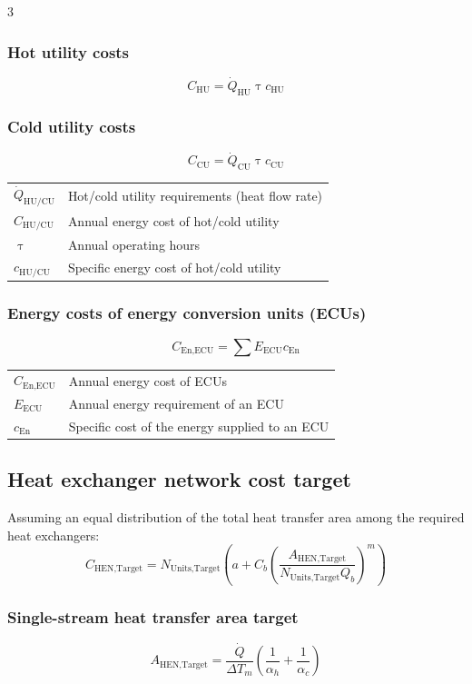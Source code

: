 \documentclass[9pt, landscape, a4paper]{article}
\renewcommand{\tau}{\uptau}
\begin{document}
\begin{multicols*}{3}
\subsubsection{Hot utility costs}
\[C_\text{HU} = \dot{Q}_\text{HU}\tau c_\text{HU}\]

\subsubsection{Cold utility costs}
\[C_\text{CU} = \dot{Q}_\text{CU}\tau c_\text{CU}\]

\begin{tabularx}{\linewidth}{@{}lX@{}}
  $\dot{Q}_{\text{HU/CU}}$ & Hot/cold utility requirements (heat flow rate) \\
  $C_{\text{HU/CU}}$ & Annual energy cost of hot/cold utility \\
  $\tau$ & Annual operating hours \\
  $c_{\text{HU/CU}}$ & Specific energy cost of hot/cold utility
\end{tabularx}

\subsubsection{Energy costs of energy conversion units (ECUs)}
\[C_{\text{En,ECU}} = \sum E_\text{ECU}c_\text{En}\]

\begin{tabularx}{\linewidth}{@{}lX@{}}
  $C_{\text{En,ECU}}$ & Annual energy cost of ECUs \\
  $E_\text{ECU}$ & Annual energy requirement of an ECU \\
  $c_\text{En}$ & Specific cost of the energy supplied to an ECU
\end{tabularx}

\subsection{Heat exchanger network cost target}
Assuming an equal distribution of the total heat transfer area among the required heat exchangers:
\[
  C_{\text{HEN,Target}} = N_{\text{Units,Target}}
  \left(a + C_b\left(
    \frac{A_{\text{HEN,Target}}}{N_{\text{Units,Target}}Q_b}
  \right)^m\right)
\]

\subsubsection{Single-stream heat transfer area target}
\[
  A_{\text{HEN,Target}} = \frac{\dot{Q}}{\Delta T_m}
  \left(\frac{1}{\alpha_h} + \frac{1}{\alpha_c}\right)
\]


\end{multicols*}
\end{document}
